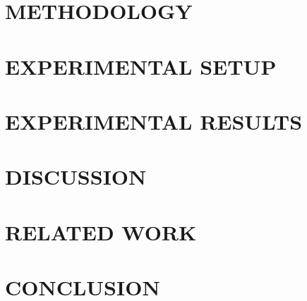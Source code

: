 \documentclass[sigconf]{acmart}
\begin{document}
\section{METHODOLOGY}
\label{sec:architecture}


\section{EXPERIMENTAL SETUP}
\label{sec:evaluation}


\section{EXPERIMENTAL RESULTS}
\label{sec:experimental_result}


\section{DISCUSSION}
\label{sec:discussion}


\section{RELATED WORK}
\label{sec:related}


\section{CONCLUSION}
\label{sec:conclusion}



 
\end{document}
